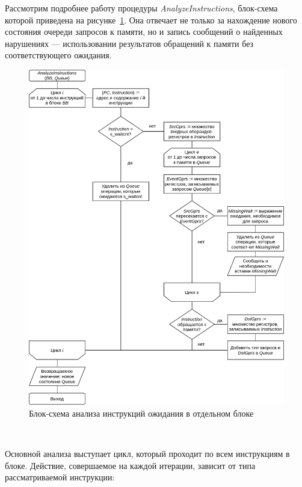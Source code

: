 \documentclass[a4paper,14pt]{extarticle}
\begin{document}
{Рассмотрим подробнее работу процедуры \textit{AnalyzeInstructions}, блок-схема которой приведена
на рисунке~\ref{fig:diagram-waitcnt-analyze}. Она отвечает не только за нахождение нового состояния
очереди запросов к памяти, но и запись сообщений о найденных нарушениях — использовании результатов
обращений к памяти без соответствующего ожидания.

\begin{figure}[H]
\centering
\includegraphics[width=\textwidth]{diagrams/alg-waitcnt-analyze}
\caption{Блок-схема анализа инструкций ожидания в отдельном блоке}
\label{fig:diagram-waitcnt-analyze}
\end{figure}\ %

Основной анализа выступает цикл, который проходит по всем инструкциям в блоке. Действие, совершаемое
на каждой итерации, зависит от типа рассматриваемой инструкции:

}
\end{document}

